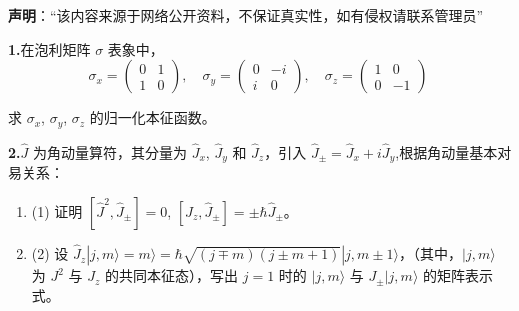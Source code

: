 
\textbf{声明}：“该内容来源于网络公开资料，不保证真实性，如有侵权请联系管理员”

\textbf{1.}在泡利矩阵 $\sigma$ 表象中，
$$\sigma_x = \begin{pmatrix}
0 & 1 \\
1 & 0
\end{pmatrix}, \quad
\sigma_y = \begin{pmatrix}
0 & -i \\
i & 0
\end{pmatrix}, \quad
\sigma_z = \begin{pmatrix}
1 & 0 \\
0 & -1
\end{pmatrix}~$$

求 $\sigma_x$, $\sigma_y$, $\sigma_z$ 的归一化本征函数。

\textbf{2.}$\hat{J}$ 为角动量算符，其分量为 $\hat J_x$, $\hat J_y$ 和 $\hat J_z$，引入 $\hat J_\pm = \hat J_x + i\hat J_y$,根据角动量基本对易关系：

\begin{enumerate}
    \item (1) 证明 $[\hat J^2, \hat J_{\pm}] = 0$, $[\hat J_z, \hat J_{\pm}] = \pm \hbar \hat J_{\pm}$。
    \item (2) 设 $\hat J_z |j, m\rangle = m\rangle = \hbar\sqrt{(j\mp m)(j\pm m+1)}|j, m\pm 1\rangle$，（其中，$|j,m\rangle$ 为 $J^2$ 与 $J_z$ 的共同本征态），写出 $j=1$ 时的 $|j,m\rangle$ 与 $J_{\pm}|j,m\rangle$ 的矩阵表示式。
\end{enumerate}
